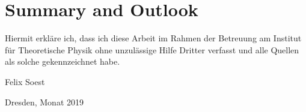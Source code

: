 \chapter{Summary and Outlook}




\clearpage
\thispagestyle{empty}
\vspace*{1.5em}

Hiermit erkläre ich, dass ich diese Arbeit im Rahmen der Betreuung am Institut
für Theoretische Physik ohne unzulässige Hilfe Dritter verfasst und alle Quellen als solche gekennzeichnet habe.

\vspace*{45em}

Felix Soest \par
Dresden, Monat 2019


